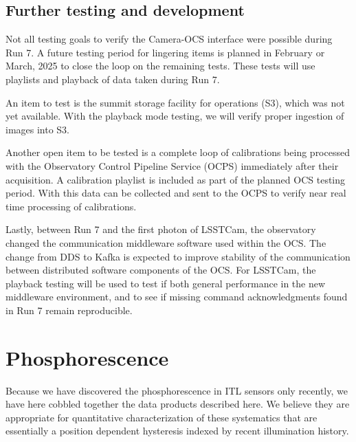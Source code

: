 \subsection{Further testing and development}
Not all testing goals to verify the Camera-OCS interface were possible during Run 7. A future testing period for lingering items is planned in February or March, 2025 to close the loop on the remaining tests. These tests will use playlists and playback of data taken during Run 7.

An item to test is the summit storage facility for operations (S3), which was not yet available. With the playback mode testing, we will verify proper ingestion of images into S3.

Another open item to be tested is a complete loop of calibrations being processed with the Observatory Control Pipeline Service (OCPS) immediately after their acquisition. A calibration playlist is included as part of the planned OCS testing period. With this data can be collected and sent to the OCPS to verify near real time processing of calibrations.

Lastly, between Run 7 and the first photon of LSSTCam, the observatory changed the communication middleware software used within the OCS. The change from DDS to Kafka is expected to improve stability of the communication between distributed software components of the OCS. For LSSTCam, the playback testing will be used to test if both general performance in the new middleware environment, and to see if missing command acknowledgments found in Run 7 remain reproducible. 

\clearpage
\section{Phosphorescence}\label{appendix:phosphorescence}
Because we have discovered the phosphorescence in ITL sensors only recently, we have here cobbled together the data products described here. We believe they are appropriate for quantitative characterization of these systematics that are essentially a position dependent hysteresis indexed by recent illumination history. 

